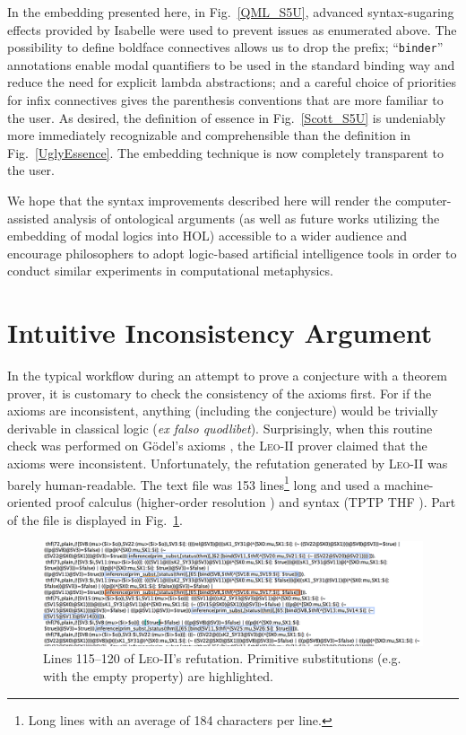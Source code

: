 \documentclass{article}
\begin{document}
In the embedding presented here, in Fig.~\ref{QML_S5U}, advanced
syntax-sugaring effects provided by Isabelle were used to prevent
issues as enumerated above. The possibility to define boldface connectives allows us to drop the prefix; ``\texttt{binder}'' annotations enable modal quantifiers to be used in the standard binding way and reduce the need for explicit lambda abstractions; and a careful choice of priorities for infix connectives gives the parenthesis conventions that are more familiar to the user. As desired, the definition of essence in Fig.~\ref{Scott_S5U} is undeniably more immediately recognizable and comprehensible than the definition in Fig.~\ref{UglyEssence}. The embedding technique is now completely transparent to the user.

We hope that the syntax improvements described here will render the computer-assisted analysis of ontological arguments (as well as future works utilizing the embedding of modal logics into HOL) accessible to a wider audience and encourage philosophers to adopt logic-based artificial intelligence tools in order to conduct similar experiments in computational metaphysics.


\section{Intuitive Inconsistency Argument} \label{sec:inconsistency}

In the typical workflow during an attempt to prove a conjecture with a theorem prover, it is customary to check the consistency of the axioms first. For if the axioms are inconsistent, anything (including the conjecture) would be trivially derivable in classical logic (\emph{ex falso quodlibet}). Surprisingly, when this routine check was performed on G\"odel's axioms \cite{C40}, the \textsc{Leo-II} prover claimed that the axioms were inconsistent. Unfortunately, the refutation generated by \textsc{Leo-II} was barely human-readable. The text file was 153 lines\footnote{Long lines with an average of 184 characters per line.} long and used a machine-oriented proof calculus (higher-order resolution \cite{W47}) and syntax (TPTP THF \cite{J22}). Part of the file is displayed in Fig.~\ref{LEO-Proof}.

\begin{figure}
\centerline{\includegraphics[width=\textwidth]{./Images/LEO-Proof.png}}
\caption{Lines 115--120 of \textsc{Leo-II}'s refutation. Primitive
  substitutions (e.g. with the empty property) are highlighted.} \label{LEO-Proof}
\end{figure}
\end{document}
